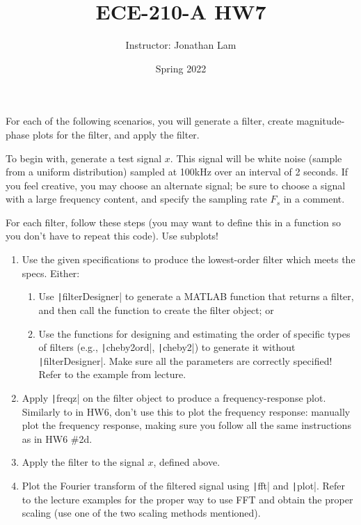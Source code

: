 \documentclass{article}
\title{ECE-210-A HW7}
\author{Instructor: Jonathan Lam}
\date{Spring 2022}
\begin{document}
\maketitle

\noindent For each of the following scenarios, you will generate a filter, create magnitude-phase plots for the filter, and apply the filter.

To begin with, generate a test signal $x$. This signal will be white noise (sample from a uniform distribution) sampled at 100kHz over an interval of 2 seconds. If you feel creative, you may choose an alternate signal; be sure to choose a signal with a large frequency content, and specify the sampling rate $F_s$ in a comment.

For each filter, follow these steps (you may want to define this in a function so you don't have to repeat this code). Use subplots!
\begin{enumerate}
\item Use the given specifications to produce the lowest-order filter which meets the specs. Either:
  \begin{enumerate}
  \item Use \texttt|filterDesigner| to generate a MATLAB function that returns a filter, and then call the function to create the filter object; or
  \item Use the functions for designing and estimating the order of specific types of filters (e.g., \texttt|cheby2ord|, \texttt|cheby2|) to generate it without \texttt|filterDesigner|. Make sure all the parameters are correctly specified! Refer to the example from lecture.
  \end{enumerate}
  
\item Apply \texttt|freqz| on the filter object to produce a frequency-response plot. Similarly to in HW6, don't use this to plot the frequency response: manually plot the frequency response, making sure you follow all the same instructions as in HW6 \#2d.
  
\item Apply the filter to the signal $x$, defined above.
  
\item Plot the Fourier transform of the filtered signal using \texttt|fft| and \texttt|plot|. Refer to the lecture examples for the proper way to use FFT and obtain the proper scaling (use one of the two scaling methods mentioned).
\end{enumerate}
\end{document}
